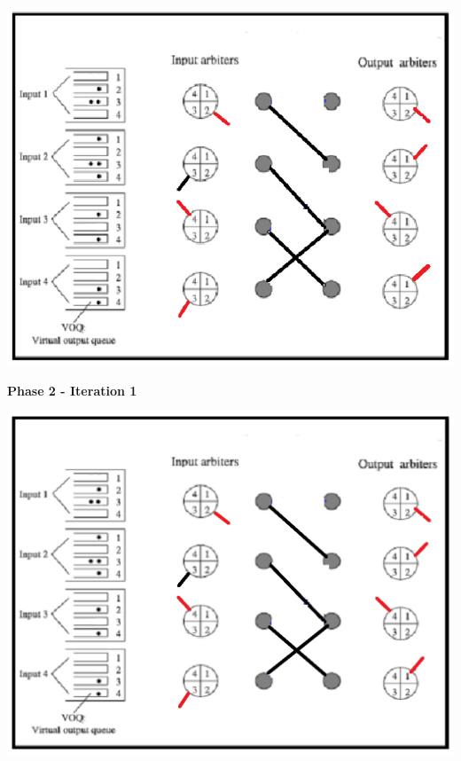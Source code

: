 \begin{qsolve}
	\begin{latin}
		
		\begin{center}
			\includegraphics*[width=0.7\linewidth]{pics/img17.png}
		\end{center}
		
		
		\textbf{Phase 2 - Iteration 1}\\
		\begin{center}
			\includegraphics*[width=0.7\linewidth]{pics/img18.png}
		\end{center}
		
	\end{latin}
\end{qsolve}
\newpage



